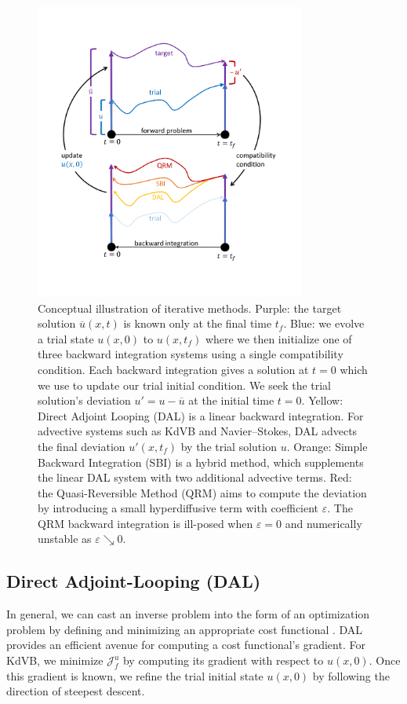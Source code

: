 \documentclass[%
 reprint,
 amsmath,amssymb,
 aps,
 pre,
]{revtex4-2}
\newcommand{\Juf}{\mathcal{J}^{u}_f}
\begin{document}
\begin{figure}
  \centering
  \includegraphics[width=3.5in]{loop.pdf}
  \caption{Conceptual illustration of iterative methods.
Purple: the target solution $\overline{u}(x, t)$ is known only at the final time $t_f$.
Blue: we evolve a trial state $u(x, 0)$ to $u(x, t_f)$ where we then initialize one of three backward integration systems using a single compatibility condition. 
Each backward integration gives a solution at $t=0$ which we use to update our trial initial condition. 
We seek the trial solution's deviation $u'=u-\overline{u}$ at the initial time $t=0$.
Yellow: Direct Adjoint Looping (DAL) is a linear backward integration.
For advective systems such as KdVB and Navier--Stokes, DAL advects the final deviation $u'(x,t_f)$ by the trial solution $u$. 
Orange: Simple Backward Integration (SBI) is a hybrid method, which supplements the linear DAL system with two additional advective terms.
Red: the Quasi-Reversible Method (QRM) aims to compute the deviation by introducing a small hyperdiffusive term with coefficient $\varepsilon$. 
The QRM backward integration is ill-posed when $\varepsilon=0$ and numerically unstable as $\varepsilon\searrow 0$.}
  \label{adj_diag}
\end{figure}

\subsection{Direct Adjoint-Looping (DAL)}\label{secDAL}
In general, we can cast an inverse problem into the form of an optimization problem by defining and minimizing an appropriate cost functional \cite{Steiner2012}.
DAL provides an efficient avenue for computing a cost functional's gradient.
For KdVB, we minimize $\Juf$ by computing its gradient with respect to $u(x,0)$.
Once this gradient is known, we refine the trial initial state $u(x,0)$ by following the direction of steepest descent.
\end{document}
